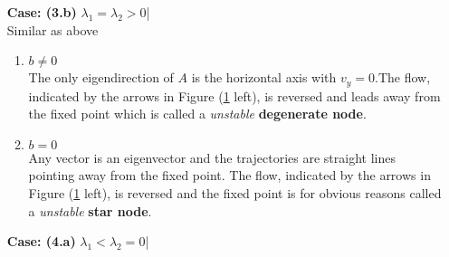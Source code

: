 \begin{enumerate}[label=\textbf{(\Alph*)}]
\begin{enumerate}
\begin{equation}
			    	bv_y=0
		    	\end{equation}
		    	\begin{enumerate}[label=(\roman*)]
			    	\item $b\neq0$\\
			    	The only eigendirection of $A$ is the horizontal axis with $v_y=0$. The fixed point is called a \emph{stable} {\textbf{degenerate node}} and its phase portrait shown in Figure (\ref{fig:stnls} left).
			    	\item $b=0$\\
			    	Any vector is an eigenvector and the trajectories are straight lines pointing towards the fixed point. The phase space portrait for this situation is shown in Figure (\ref{fig:stnls} right) and the fixed point is for obvious reasons called a \emph{stable} {\textbf{star node}}.
		    	\end{enumerate}
		    	\begin{figure}[h!]
					\centering
					\texttt{[image: dnls.png]}
					\caption{Degenerate case where the eigenvalues are the same. The degenerate node (left) has only one eigendirection, the star node (right) has infinitely many.}
					\label{fig:stnls}
		    	\end{figure}
		    \item[\textbf{Case: (3.b)}] $\lambda_1=\lambda_2>0$\quad|\quad {}\\
		    	Similar as above
				\begin{enumerate}[label=(\roman*)]
			    	\item $b\neq0$\\
			    	The only eigendirection of $A$ is the horizontal axis with $v_y=0$.The flow, indicated by the arrows in Figure (\ref{fig:stnls} left), is reversed and leads away from the fixed point which is called a \emph{unstable} {\textbf{degenerate node}}.
			    	\item $b=0$\\
			    	Any vector is an eigenvector and the trajectories are straight lines pointing away from the fixed point.
			    	The flow, indicated by the arrows in Figure (\ref{fig:stnls} left), is reversed and the fixed point is for obvious reasons called a \emph{unstable} {\textbf{star node}}.
		    	\end{enumerate}	    
		    \item[\textbf{Case: (4.a)}] $\lambda_1<\lambda_2=0$\quad|\quad {}\\	

\end{enumerate}
\end{enumerate}
